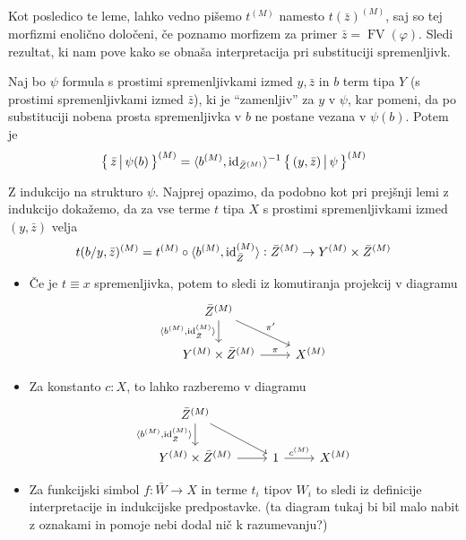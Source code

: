 \documentclass[../kategoricna_logika.tex]{subfiles}
\begin{document}
\noindent
Kot posledico te leme, lahko vedno pišemo $t^{(M)}$ namesto $t(\bar{z})^{(M)}$,
saj so tej morfizmi enolično določeni,
če poznamo morfizem za primer $\bar{z} = \operatorname{FV}(\varphi)$.
Sledi rezultat, ki nam pove kako se obnaša interpretacija pri substituciji spremenljivk.
\begin{lema}
  Naj bo $\psi$ formula s prostimi spremenljivkami izmed $y, \bar{z}$ in $b$ term tipa $Y$ (s prostimi spremenljivkami izmed $\bar{z}$), 
  ki je ``zamenljiv'' za $y$ v $\psi$, kar pomeni, da po substituciji nobena prosta spremenljivka v $b$ ne postane vezana v $\psi(b)$.
  Potem je 
  $$\left\lbrace\,\bar{z} \,\middle|\, \psi(b)\,\right\rbrace^{(M)} = \langle b^{(M)}, \mathrm{id}_{{\bar{Z}}^{(M)}}\rangle^{-1} \left\lbrace\,(y, \bar{z}) \,\middle|\, \psi\,\right\rbrace^{(M)}$$
\end{lema}
\begin{dokaz}
  Z indukcijo na strukturo $\psi$.
  Najprej opazimo, da podobno kot pri prejšnji lemi z indukcijo dokažemo,
  da za vse terme $t$ tipa $X$ s prostimi spremenljivkami izmed $(y, \bar{z})$ velja
  $$t(b/y, \bar{z})^{(M)} = t^{(M)} \circ \langle b^{(M)}, \mathrm{id}_{\bar{Z}}^{(M)} \rangle : \bar{Z}^{(M)} \to Y^{(M)} \times \bar{Z}^{(M)}$$
  \begin{itemize}
    \item Če je $t \equiv x$ spremenljivka, potem to sledi iz komutiranja projekcij v diagramu
      \begin{equation*}
      \begin{tikzcd}
        \bar{Z}^{(M)} \ar[d, "\fprod{b^{(M)}, \mathrm{id}_{\bar{Z}}^{(M)}}"'] \ar[dr, "\pi'"] & \\
        Y^{(M)} \times \bar{Z}^{(M)} \ar[r, "\pi"] & X^{(M)}
      \end{tikzcd}
      \end{equation*}
    
    \item Za konstanto ${c : X}$, to lahko razberemo v diagramu
      \begin{equation*}
      \begin{tikzcd}
        \bar{Z}^{(M)} \ar[d, "\fprod{b^{(M)}, \mathrm{id}_{\bar{Z}}^{(M)}}"'] \ar[dr] & & \\
        Y^{(M)} \times \bar{Z}^{(M)} \ar[r] & 1 \ar[r, "c^{(M)}"] & X^{(M)}
      \end{tikzcd}
      \end{equation*}

    \item Za funkcijski simbol $f : \bar{W} \to X$ in terme $t_i$ tipov $W_i$
      to sledi iz definicije interpretacije in indukcijske predpostavke.
      (ta diagram tukaj bi bil malo nabit z oznakami in pomoje nebi dodal nič k razumevanju?)
  \end{itemize}


\end{dokaz}
\end{document}
